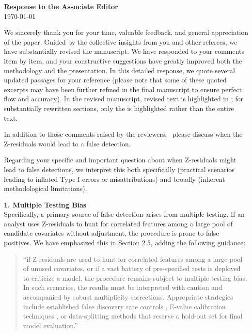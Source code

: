 \documentclass[11pt]{article}
\newcommand*{\mybox}[2]{%
  \par\medskip\noindent
  \colorbox{#1!30}{\parbox{.98\linewidth}{#2}}%
  \par\medskip
}
\begin{document}
\begin{center}
    {\LARGE \textbf{Response to the Associate Editor}} \\[1em]
    {\large \today}
\end{center}
\vspace{2em} %
\normalsize


We sincerely thank you for your time, valuable feedback, and general appreciation of the paper. Guided by the collective insights from you and other referees, we have substantially revised the manuscript. We have responded to your comments item by item, and your constructive suggestions have greatly improved both the methodology and the presentation. In this detailed response, we quote several updated passages for your reference (please note that some of these quoted excerpts may have been further refined in the final manuscript to ensure perfect flow and accuracy). In the revised manuscript, revised text is highlighted in ; for substantially rewritten sections, only the  is highlighted rather than the entire text. 


\mybox{gray}{
In addition to those comments raised by the reviewers,  please discuss when the Z-residuals would lead to a false detection.
}

\medskip

Regarding your specific and important question about when Z-residuals might lead to false detections, we interpret this both specifically (practical scenarios leading to inflated Type I errors or misattributions) and broadly (inherent methodological limitations).

\textbf{1. Multiple Testing Bias} \\
Specifically, a primary source of false detection arises from multiple testing. If an analyst uses Z-residuals to hunt for correlated features among a large pool of candidate covariates without adjustment, the procedure is prone to false positives. We have emphasized this in Section 2.5, adding the following guidance:

\begin{quote}
``if Z-residuals are used to hunt for correlated features among a large pool of unused covariates, or if a vast battery of pre-specified tests is deployed to criticize a model, the procedure remains subject to multiple testing bias. In such scenarios, the results must be interpreted with caution and accompanied by robust multiplicity corrections. Appropriate strategies include established false discovery rate controls \citep{Benjamini1995}, E-value calibration techniques \citep{VovkVladimir2021ECCA, RamdasAaditya2023GSaS}, or data-splitting methods that reserve a hold-out set for final model evaluation.''
\end{quote}
\end{document}
